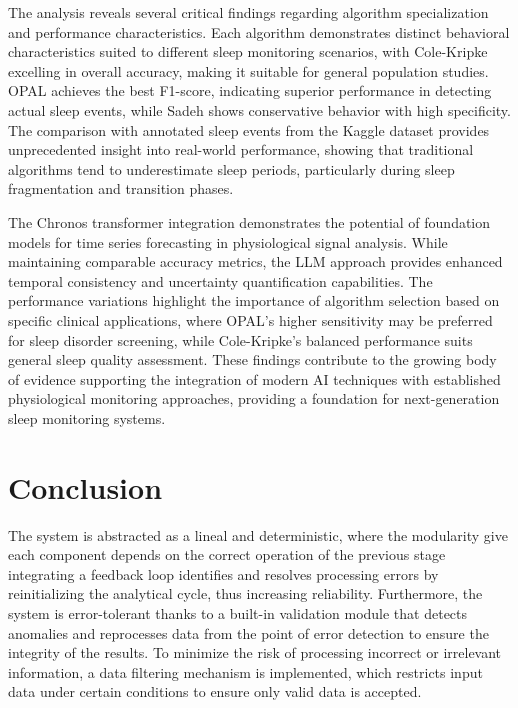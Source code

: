 \documentclass[conference]{IEEEtran}
\begin{document}
The analysis reveals several critical findings regarding algorithm specialization and performance characteristics. Each algorithm demonstrates distinct behavioral characteristics suited to different sleep monitoring scenarios, with Cole-Kripke excelling in overall accuracy, making it suitable for general population studies. OPAL achieves the best F1-score, indicating superior performance in detecting actual sleep events, while Sadeh shows conservative behavior with high specificity. The comparison with annotated sleep events from the Kaggle dataset provides unprecedented insight into real-world performance, showing that traditional algorithms tend to underestimate sleep periods, particularly during sleep fragmentation and transition phases.

The Chronos transformer integration demonstrates the potential of foundation models for time series forecasting in physiological signal analysis. While maintaining comparable accuracy metrics, the LLM approach provides enhanced temporal consistency and uncertainty quantification capabilities. The performance variations highlight the importance of algorithm selection based on specific clinical applications, where OPAL's higher sensitivity may be preferred for sleep disorder screening, while Cole-Kripke's balanced performance suits general sleep quality assessment. These findings contribute to the growing body of evidence supporting the integration of modern AI techniques with established physiological monitoring approaches, providing a foundation for next-generation sleep monitoring systems.

\section{Conclusion}
The system is abstracted as a lineal and deterministic, where the modularity
give each component depends on the correct operation of the previous stage integrating a feedback loop identifies
and resolves processing errors by reinitializing the analytical cycle, thus increasing reliability. Furthermore,
the system is error-tolerant thanks to a built-in validation module that detects anomalies and reprocesses data
from the point of error detection to ensure the integrity of the results. To minimize the risk of processing
incorrect or irrelevant information, a data filtering mechanism is implemented, which restricts input data under
certain conditions to ensure only valid data is accepted.
\end{document}
